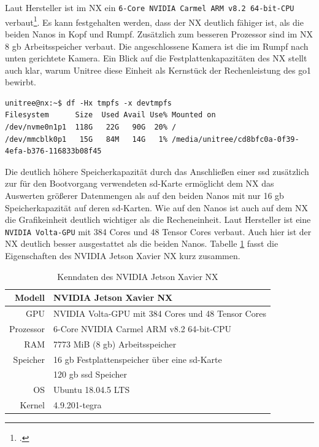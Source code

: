 Laut Hersteller ist im NX ein \texttt{6-Core NVIDIA Carmel ARM v8.2 64-\allowbreak bit-\allowbreak CPU} verbaut\footcite{nvidia_website_vergleich}.
Es kann festgehalten werden, dass der NX deutlich fähiger ist, als die beiden Nanos in Kopf und Rumpf.
Zusätzlich zum besseren Prozessor sind im NX \num{8} \gls{gb} Arbeitsspeicher verbaut.
Die angeschlossene Kamera ist die im Rumpf nach unten gerichtete Kamera.
Ein Blick auf die Festplattenkapazitäten des NX stellt auch klar, warum Unitree diese Einheit als Kernstück der Rechenleistung des
\gls{go1} bewirbt.

\begin{lstlisting}[label=lst:nx-fs,columns=fixed]
unitree@nx:~$ df -Hx tmpfs -x devtmpfs
Filesystem      Size  Used Avail Use% Mounted on
/dev/nvme0n1p1  118G   22G   90G  20% /
/dev/mmcblk0p1   15G   84M   14G   1% /media/unitree/cd8bfc0a-0f39-4efa-b376-116833b08f45
\end{lstlisting}

Die deutlich höhere Speicherkapazität durch das Anschließen einer \gls{ssd} zusätzlich zur für den Bootvorgang verwendeten
\gls{sd}-Karte ermöglicht dem NX das Auswerten größerer Datenmengen als auf den beiden Nanos mit nur \num{16} \gls{gb}
Speicherkapazität auf deren \gls{sd}-Karten.
Wie auf den Nanos ist auch auf dem NX die Grafikeinheit deutlich wichtiger als die Recheneinheit.
Laut Hersteller ist eine \texttt{NVIDIA Volta-GPU} mit 384 Cores und 48 Tensor Cores verbaut.
Auch hier ist der NX deutlich besser ausgestattet als die beiden Nanos.
Tabelle \ref{tab:data-nx} fasst die Eigenschaften des NVIDIA Jetson Xavier NX kurz zusammen.

\begin{table}[h]
    \centering
    \begin{tabularx}{\textwidth}{|r|X|}
        \hline
        Modell    & NVIDIA Jetson Xavier NX                                        \\ \hline
        GPU       & NVIDIA Volta-GPU mit 384 Cores und 48 Tensor Cores             \\ \hline
        Prozessor & 6-Core NVIDIA Carmel ARM v8.2 64-bit-CPU                       \\ \hline
        RAM       & \num{7773} MiB (\num{8} \gls{gb}) Arbeitsspeicher              \\ \hline
        Speicher  & \num{16} \gls{gb} Festplattenspeicher über eine \gls{sd}-Karte \\
        & \num{120} \gls{gb} \gls{ssd} Speicher                          \\ \hline
        OS        & Ubuntu 18.04.5 LTS                                             \\ \hline
        Kernel    & 4.9.201-tegra                                                  \\ \hline
    \end{tabularx}\caption{Kenndaten des NVIDIA Jetson Xavier NX}\label{tab:data-nx}
\end{table}

